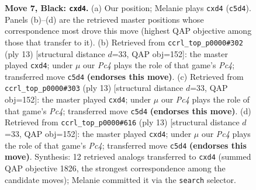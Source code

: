 \documentclass[11pt]{article}
\begin{document}
\begin{figure}[p]
\caption{\textbf{Move 7, Black: \texttt{cxd4}.} (a) Our position; Melanie plays \texttt{cxd4} (\texttt{c5d4}). Panels (b)--(d) are the retrieved master positions whose correspondence most drove this move (highest QAP objective among those that transfer to it). (b) Retrieved from \texttt{ccrl\_top\_p0000\#302} (ply 13) [structural distance $d$=33, QAP obj=152]: the master played \texttt{cxd4}; under $\mu$ our \emph{Pc4} plays the role of that game's \emph{Pc4}; transferred move \texttt{c5d4} \textbf{(endorses this move)}. (c) Retrieved from \texttt{ccrl\_top\_p0000\#303} (ply 13) [structural distance $d$=33, QAP obj=152]: the master played \texttt{cxd4}; under $\mu$ our \emph{Pc4} plays the role of that game's \emph{Pc4}; transferred move \texttt{c5d4} \textbf{(endorses this move)}. (d) Retrieved from \texttt{ccrl\_top\_p0000\#616} (ply 13) [structural distance $d$=33, QAP obj=152]: the master played \texttt{cxd4}; under $\mu$ our \emph{Pc4} plays the role of that game's \emph{Pc4}; transferred move \texttt{c5d4} \textbf{(endorses this move)}. Synthesis: 12 retrieved analogs transferred to \texttt{cxd4} (summed QAP objective 1826, the strongest correspondence among the candidate moves); Melanie committed it via the \texttt{search} selector.}
\label{fig:thought-m13}
\end{figure}

\clearpage
\end{document}
